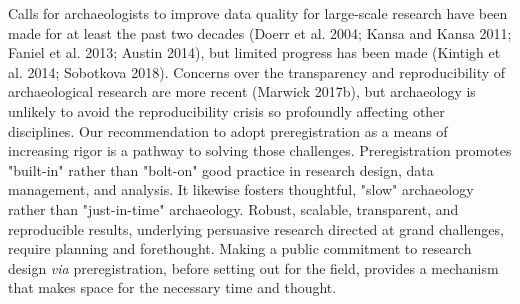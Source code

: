 \documentclass[article]{sa}
\begin{document}
Calls for archaeologists to improve data quality for large-scale
research have been made for at least the past two decades (Doerr et al.
2004; Kansa and Kansa 2011; Faniel et al. 2013; Austin 2014), but
limited progress has been made (Kintigh et al. 2014; Sobotkova 2018).
Concerns over the transparency and reproducibility of archaeological
research are more recent (Marwick 2017b), but archaeology is unlikely to
avoid the reproducibility crisis so profoundly affecting other
disciplines. Our recommendation to adopt preregistration as a means of
increasing rigor is a pathway to solving those challenges.
Preregistration promotes "built-in" rather than "bolt-on" good practice
in research design, data management, and analysis. It likewise fosters
thoughtful, "slow" archaeology rather than "just-in-time" archaeology.
Robust, scalable, transparent, and reproducible results, underlying
persuasive research directed at grand challenges, require planning and
forethought. Making a public commitment to research design \emph{via}
preregistration, before setting out for the field, provides a mechanism
that makes space for the necessary time and thought.

\nocite{*}

\end{document}
